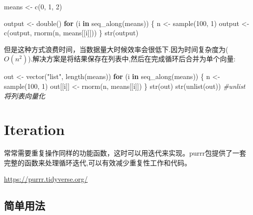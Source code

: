 \documentclass[
]{book}
\newenvironment{Shaded}{\begin{snugshade}}{\end{snugshade}}
\newcommand{\CommentTok}[1]{\textcolor[rgb]{0.56,0.35,0.01}{\textit{#1}}}
\newcommand{\ControlFlowTok}[1]{\textcolor[rgb]{0.13,0.29,0.53}{\textbf{#1}}}
\newcommand{\DecValTok}[1]{\textcolor[rgb]{0.00,0.00,0.81}{#1}}
\newcommand{\FunctionTok}[1]{\textcolor[rgb]{0.00,0.00,0.00}{#1}}
\newcommand{\NormalTok}[1]{#1}
\newcommand{\OtherTok}[1]{\textcolor[rgb]{0.56,0.35,0.01}{#1}}
\newcommand{\StringTok}[1]{\textcolor[rgb]{0.31,0.60,0.02}{#1}}
\begin{document}
\begin{Shaded}
\begin{Highlighting}[]
\NormalTok{means }\OtherTok{\textless{}{-}} \FunctionTok{c}\NormalTok{(}\DecValTok{0}\NormalTok{, }\DecValTok{1}\NormalTok{, }\DecValTok{2}\NormalTok{)}

\NormalTok{output }\OtherTok{\textless{}{-}} \FunctionTok{double}\NormalTok{()}
\ControlFlowTok{for}\NormalTok{ (i }\ControlFlowTok{in} \FunctionTok{seq\_along}\NormalTok{(means)) \{}
\NormalTok{  n }\OtherTok{\textless{}{-}} \FunctionTok{sample}\NormalTok{(}\DecValTok{100}\NormalTok{, }\DecValTok{1}\NormalTok{)}
\NormalTok{  output }\OtherTok{\textless{}{-}} \FunctionTok{c}\NormalTok{(output, }\FunctionTok{rnorm}\NormalTok{(n, means[[i]]))}
\NormalTok{\}}
\FunctionTok{str}\NormalTok{(output)}
\end{Highlighting}
\end{Shaded}

但是这种方式浪费时间，当数据量大时候效率会很低下.因为时间复杂度为(\(O(n^2)\)).解决方案是将结果保存在列表中,然后在完成循环后合并为单个向量:

\begin{Shaded}
\begin{Highlighting}[]
\NormalTok{out }\OtherTok{\textless{}{-}} \FunctionTok{vector}\NormalTok{(}\StringTok{"list"}\NormalTok{, }\FunctionTok{length}\NormalTok{(means))}
\ControlFlowTok{for}\NormalTok{ (i }\ControlFlowTok{in} \FunctionTok{seq\_along}\NormalTok{(means)) \{}
\NormalTok{  n }\OtherTok{\textless{}{-}} \FunctionTok{sample}\NormalTok{(}\DecValTok{100}\NormalTok{, }\DecValTok{1}\NormalTok{)}
\NormalTok{  out[[i]] }\OtherTok{\textless{}{-}} \FunctionTok{rnorm}\NormalTok{(n, means[[i]])}
\NormalTok{\}}
\FunctionTok{str}\NormalTok{(out)}
\FunctionTok{str}\NormalTok{(}\FunctionTok{unlist}\NormalTok{(out)) }\CommentTok{\#unlist将列表向量化}
\end{Highlighting}
\end{Shaded}

\hypertarget{iteration}{%
\chapter{Iteration}\label{iteration}}

常常需要重复操作同样的功能函数，这时可以用迭代来实现。purrr包提供了一套完整的函数来处理循环迭代,可以有效减少重复性工作和代码。

\url{https://purrr.tidyverse.org/}

\hypertarget{ux7b80ux5355ux7528ux6cd5}{%
\section{简单用法}\label{ux7b80ux5355ux7528ux6cd5}}
\end{document}
